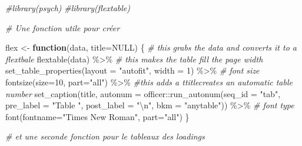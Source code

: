 \documentclass[
]{book}
\newenvironment{Shaded}{\begin{snugshade}}{\end{snugshade}}
\newcommand{\AttributeTok}[1]{\textcolor[rgb]{0.77,0.63,0.00}{#1}}
\newcommand{\CommentTok}[1]{\textcolor[rgb]{0.56,0.35,0.01}{\textit{#1}}}
\newcommand{\ConstantTok}[1]{\textcolor[rgb]{0.00,0.00,0.00}{#1}}
\newcommand{\ControlFlowTok}[1]{\textcolor[rgb]{0.13,0.29,0.53}{\textbf{#1}}}
\newcommand{\DecValTok}[1]{\textcolor[rgb]{0.00,0.00,0.81}{#1}}
\newcommand{\FunctionTok}[1]{\textcolor[rgb]{0.00,0.00,0.00}{#1}}
\newcommand{\NormalTok}[1]{#1}
\newcommand{\OtherTok}[1]{\textcolor[rgb]{0.56,0.35,0.01}{#1}}
\newcommand{\SpecialCharTok}[1]{\textcolor[rgb]{0.00,0.00,0.00}{#1}}
\newcommand{\StringTok}[1]{\textcolor[rgb]{0.31,0.60,0.02}{#1}}
\begin{document}
\begin{Shaded}
\begin{Highlighting}[]
\CommentTok{\#library(psych)}
\CommentTok{\#library(flextable)}

\CommentTok{\# Une fonction utile pour créer }

\NormalTok{flex }\OtherTok{\textless{}{-}} \ControlFlowTok{function}\NormalTok{(data, }\AttributeTok{title=}\ConstantTok{NULL}\NormalTok{) \{}
  \CommentTok{\# this grabs the data and converts it to a flextbale}
  \FunctionTok{flextable}\NormalTok{(data) }\SpecialCharTok{\%\textgreater{}\%}
  \CommentTok{\# this makes the table fill the page width}
  \FunctionTok{set\_table\_properties}\NormalTok{(}\AttributeTok{layout =} \StringTok{"autofit"}\NormalTok{, }\AttributeTok{width =} \DecValTok{1}\NormalTok{) }\SpecialCharTok{\%\textgreater{}\%}
  \CommentTok{\# font size}
  \FunctionTok{fontsize}\NormalTok{(}\AttributeTok{size=}\DecValTok{10}\NormalTok{, }\AttributeTok{part=}\StringTok{"all"}\NormalTok{) }\SpecialCharTok{\%\textgreater{}\%}
    \CommentTok{\#this adds a ttitlecreates an automatic table number}
      \FunctionTok{set\_caption}\NormalTok{(title, }
                  \AttributeTok{autonum =}\NormalTok{ officer}\SpecialCharTok{::}\FunctionTok{run\_autonum}\NormalTok{(}\AttributeTok{seq\_id =} \StringTok{"tab"}\NormalTok{, }
                                                 \AttributeTok{pre\_label =} \StringTok{"Table "}\NormalTok{, }
                                                 \AttributeTok{post\_label =} \StringTok{"}\SpecialCharTok{\textbackslash{}n}\StringTok{"}\NormalTok{, }
                                                 \AttributeTok{bkm =} \StringTok{"anytable"}\NormalTok{)) }\SpecialCharTok{\%\textgreater{}\%}
  \CommentTok{\# font type}
  \FunctionTok{font}\NormalTok{(}\AttributeTok{fontname=}\StringTok{"Times New Roman"}\NormalTok{, }\AttributeTok{part=}\StringTok{"all"}\NormalTok{)}
\NormalTok{\}}

\CommentTok{\# et une seconde fonction pour le tableaux des loadings}



\end{Highlighting}
\end{Shaded}
\end{document}
